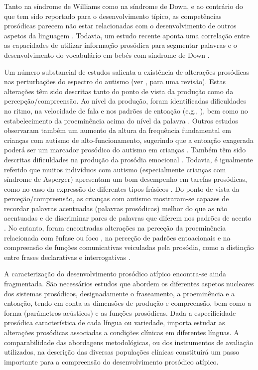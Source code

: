\documentclass[output=paper,colorlinks,citecolor=brown,booklanguage=portuguese]{langscibook}
\begin{document}
Tanto na síndrome de Williams como na síndrome de Down, e ao contrário do que tem sido reportado para o desenvolvimento típico, as competências prosódicas parecem não estar relacionadas com o desenvolvimento de outros aspetos da linguagem \citep{Stojanovik2007, Stojanovik2011, MasonApps2018}. Todavia, um estudo recente aponta uma correlação entre as capacidades de utilizar informação prosódica para segmentar palavras e o desenvolvimento do vocabulário em bebés com síndrome de Down \citep{Frota2020a}.

Um número substancial de estudos salienta a existência de alterações prosódicas nas perturbações do espectro do autismo (ver \citealp{McCann2003, Peppe2018}, para uma revisão). Estas alterações têm sido descritas tanto do ponto de vista da produção como da percepção/compreensão. Ao nível da produção, foram identificadas dificuldades no ritmo, na velocidade de fala e nos padrões de entoação (e.g., \citealp{McCann2003, Shriberg2001, Paul2005}), bem como no estabelecimento da proeminência acima do nível da palavra \citep{McCann2007}. Outros estudos observaram também um aumento da altura da frequência fundamental em crianças com autismo de alto-funcionamento, sugerindo que a entoação exagerada poderá ser um marcador prosódico do autismo em crianças \citep{Nadig2012, Filipe2014}. Também têm sido descritas dificuldades na produção da prosódia emocional \citep{Filipe2016}. Todavia, é igualmente referido que muitos indivíduos com autismo (especialmente crianças com síndrome de Asperger) apresentam um bom desempenho em tarefas prosódicas, como no caso da expressão de diferentes tipos frásicos \citep{Paul2005, Peppe2011, Filipe2014}. Do ponto de vista da perceção/compreensão, as crianças com autismo mostraram-se capazes de recordar palavras acentuadas (palavras prosódicas) melhor do que as não acentuadas \citep{Fine1991} e de discriminar pares de palavras que diferem nos padrões de acento \citep{Grossman2010}. No entanto, foram encontradas alterações na perceção da proeminência relacionada com ênfase ou foco \citep{Paul2005}, na perceção de padrões entoacionais \citep{Peppe2007, Filipe2016} e na compreensão de funções comunicativas veiculadas pela prosódia, como a distinção entre frases declarativas e interrogativas \citep{Paul2005, Peppe2007, Peppe2011, Filipe2016}.

A caracterização do desenvolvimento prosódico atípico encontra-se ainda fragmentada. São necessários estudos que abordem os diferentes aspetos nucleares dos sistemas prosódicos, designadamente o fraseamento, a proeminência e a entoação, tendo em conta as dimensões de produção e compreensão, bem como a forma (parâmetros acústicos) e as funções prosódicas. Dada a especificidade prosódica característica de cada língua ou variedade, importa estudar as alterações prosódicas associadas a condições clínicas em diferentes línguas. A comparabilidade das abordagens metodológicas, ou dos instrumentos de avaliação utilizados, na descrição das diversas populações clínicas constituirá um passo importante para a compreensão do desenvolvimento prosódico atípico.
\end{document}
